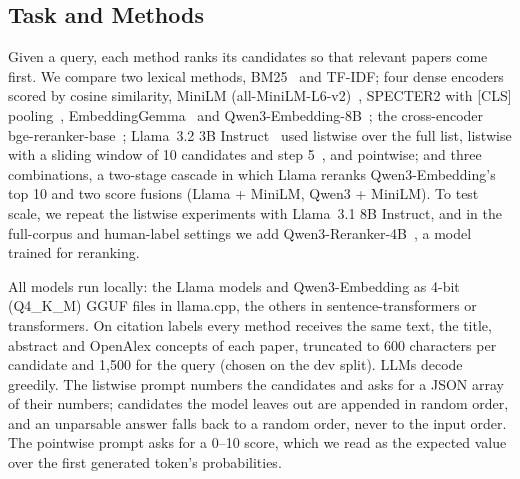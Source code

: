 \documentclass[sigconf,nonacm]{acmart}
\begin{document}
\subsection{Task and Methods}
\label{sec:methods}
Given a query, each method ranks its candidates so that relevant papers come first.
We compare two lexical methods, BM25~\citep{robertson2009bm25} and TF-IDF; four dense encoders scored by cosine similarity, MiniLM (all-MiniLM-L6-v2)~\citep{wang2020minilm,reimers2019sbert}, SPECTER2 with [CLS] pooling~\citep{singh2023scirepeval,cohan2020specter}, EmbeddingGemma~\citep{vera2025embeddinggemma} and Qwen3-Embedding-8B~\citep{zhang2025qwen3embedding}; the cross-encoder bge-reranker-base~\citep{xiao2024cpack}; Llama~3.2 3B Instruct~\citep{grattafiori2024llama3} used listwise over the full list, listwise with a sliding window of 10 candidates and step 5~\citep{sun2023rankgpt}, and pointwise; and three combinations, a two-stage cascade in which Llama reranks Qwen3-Embedding's top 10 and two score fusions (Llama + MiniLM, Qwen3 + MiniLM).
To test scale, we repeat the listwise experiments with Llama~3.1 8B Instruct, and in the full-corpus and human-label settings we add Qwen3-Reranker-4B~\citep{zhang2025qwen3embedding}, a model trained for reranking.

All models run locally: the Llama models and Qwen3-Embedding as 4-bit (Q4\_K\_M) GGUF files in llama.cpp, the others in sentence-transformers or transformers.
On citation labels every method receives the same text, the title, abstract and OpenAlex concepts of each paper, truncated to 600 characters per candidate and 1,500 for the query (chosen on the dev split).
LLMs decode greedily.
The listwise prompt numbers the candidates and asks for a JSON array of their numbers; candidates the model leaves out are appended in random order, and an unparsable answer falls back to a random order, never to the input order.
The pointwise prompt asks for a 0--10 score, which we read as the expected value over the first generated token's probabilities.
\end{document}
